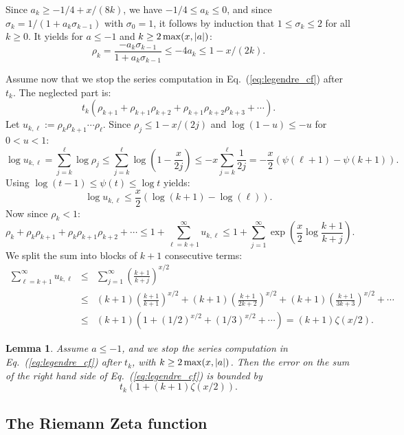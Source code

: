 \documentclass[12pt]{amsart}
\newtheorem{lemma}{Lemma}
\begin{document}
Since $a_k \geq -1/4 + x/(8k)$, we have $-1/4 \leq a_k \leq 0$, and
since $\sigma_k = 1/(1 + a_k \sigma_{k-1})$ with $\sigma_0 = 1$,
it follows by induction that $1 \leq \sigma_k \leq 2$ for all $k \geq 0$.
It yields for $a \leq -1$ and $k \geq 2 \, {\rm max}(x,|a|)$:
\[ \rho_k = \frac{-a_k \sigma_{k-1}}{1 + a_k \sigma_{k-1}} 
   \leq -4 a_k \leq 1 - x/(2k). \]

Assume now that we stop the series computation in Eq.~(\ref{eq:legendre_cf})
after $t_k$. The neglected part is:
\[ t_k (\rho_{k+1} + \rho_{k+1} \rho_{k+2} + \rho_{k+1} \rho_{k+2} \rho_{k+3}
   + \cdots). \]
Let $u_{k,\ell} := \rho_{k} \rho_{k+1} \cdots \rho_{\ell}$.
Since $\rho_j \leq 1 - x/(2j)$ and $\log(1-u) \leq -u$ for $0 < u < 1$:
\[ \log u_{k,\ell} = \sum_{j=k}^{\ell} \log \rho_j
   \leq \sum_{j=k}^{\ell} \log (1-\frac{x}{2j})
   \leq -x \sum_{j=k}^{\ell} \frac{1}{2j}
   = -\frac{x}{2} (\psi(\ell+1) - \psi(k+1)). \]
Using $\log(t-1) \leq \psi(t) \leq \log t$ yields:
\[ \log u_{k,\ell} \leq \frac{x}{2} (\log(k+1) - \log(\ell)). \]
Now since $\rho_k < 1$:
\[ \rho_k + \rho_k \rho_{k+1} + \rho_k \rho_{k+1} \rho_{k+2} + \cdots
   \leq 1 + \sum_{\ell=k+1}^{\infty} u_{k,\ell}
   \leq 1 + \sum_{j=1}^{\infty} \exp(\frac{x}{2} \log\frac{k+1}{k+j}). \]
We split the sum into blocks of $k+1$ consecutive terms:
\begin{eqnarray*}
\sum_{\ell=k+1}^{\infty} u_{k,\ell}
   &\leq& \sum_{j=1}^{\infty} \left( \frac{k+1}{k+j} \right)^{x/2} \\
   &\leq& (k+1) \left( \frac{k+1}{k+1} \right)^{x/2}
   + (k+1) \left( \frac{k+1}{2k+2} \right)^{x/2}
   + (k+1) \left( \frac{k+1}{3k+3} \right)^{x/2} + \cdots \\
   &\leq& (k+1) (1 + (1/2)^{x/2} + (1/3)^{x/2} + \cdots) = (k+1) \zeta(x/2).
\end{eqnarray*}

\begin{lemma}
Assume $a \leq -1$,
and we stop the series computation in Eq.~(\ref{eq:legendre_cf})
after $t_k$, with $k \geq 2 \, {\rm max}(x,|a|)$.
Then the error on the sum of the right hand side
of Eq.~(\ref{eq:legendre_cf}) is bounded by
\[ t_k (1 + (k+1) \zeta(x/2)). \]
\end{lemma}

\subsection{The Riemann Zeta function}
\end{document}
